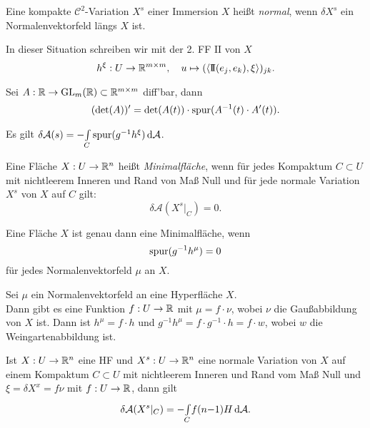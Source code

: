 \documentclass{cheat-sheet}
\newcommand{\FFII}{\mathrm{I\!I}} %
\newcommand{\A}{\mathcal{A}} %
\newcommand{\Cont}{\mathcal{C}} %
\begin{document}
\begin{defn}
  Eine kompakte $\Cont^2$-Variation $X^s$ einer Immersion $X$ heißt \emph{normal}, wenn $\delta X^s$ ein Normalenvektorfeld längs $X$ ist.
\end{defn}

\begin{defn}
  In dieser Situation schreiben wir mit der 2. FF $\FFII$ von $X$
  \[ h^\xi : U \to \R^{m \times m}, \quad u \mapsto (\langle \FFII(e_j, e_k), \xi \rangle)_{jk}. \]
\end{defn}

\begin{lem}
  Sei $A : \mathbb{R} \to \mathrm{GL}_m(\mathbb{R}) \subset \mathbb{R}^{m \times m}$ diff'bar, dann
  \[ (\det(A))' = \det(A(t)) \cdot \operatorname{spur}(A^{-1}(t) \cdot A'(t)). \]
\end{lem}

\begin{satz}
  Es gilt $\delta \A(s) = - \Int{C}{}{\spur(g^{-1} h^\xi)}{\A}$.
\end{satz}

\begin{defn}
  Eine Fläche $X : U \to \mathbb{R}^n$ heißt \emph{Minimalfläche}, wenn für jedes Kompaktum $C \subset U$ mit nichtleerem Inneren und Rand von Maß Null und für jede normale Variation $X^s$ von $X$ auf $C$ gilt:
  \[ \delta \A(X^s|_C) = 0. \]
\end{defn}

\begin{satz}
  Eine Fläche $X$ ist genau dann eine Minimalfläche, wenn
  \[ \operatorname{spur}(g^{-1} h^{\mu}) = 0 \]
  für jedes Normalenvektorfeld $\mu$ an $X$.
\end{satz}



\begin{bem}
  Sei $\mu$ ein Normalenvektorfeld an eine Hyperfläche $X$. \\
  Dann gibt es eine Funktion $f : U \to \mathbb{R}$ mit $\mu = f \cdot \nu$, wobei $\nu$ die Gaußabbildung von $X$ ist. Dann ist $h^\mu = f \cdot h$ und $g^{-1} h^{\mu} = f \cdot g^{-1} \cdot h = f \cdot w$, wobei $w$ die Weingartenabbildung ist.
\end{bem}

\begin{satz}
  Ist $X : U \to \mathbb{R}^n$ eine HF und $X^s : U \to \mathbb{R}^n$ eine normale Variation von $X$ auf einem Kompaktum $C \subset U$ mit nichtleerem Inneren und Rand vom Maß Null und $\xi = \delta X^x = f \nu$ mit $f : U \to \mathbb{R}$, dann gilt
  \[ \delta \A(X^s|_C) = - \Int{C}{}{f (n{-}1) H}{\A}. \]
\end{satz}
\end{document}
